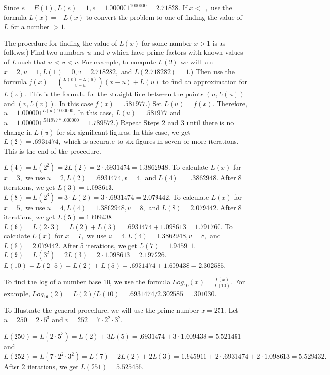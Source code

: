 Since $e = E(1), L(e) = 1, e = 1.000001^{1000000} = 2.71828.$\nl
If $x < 1,$ use the formula $L(x) = - L(x)$ to convert the problem to one of finding the value of $L$ for a number $> 1.$\nl

The procedure for finding the value of $L(x)$ for some number $x > 1$ is as follows:)  Find two numbers $u$ and $v$ which have prime factors with known values of $L$ such that $u < x < v.$  For example, to compute $L(2)$ we will use $x = 2, u = 1, L(1) = 0, v = 2.718282,$ and $L(2.718282) = 1.$)  Then use the formula $f(x) = \left(\frac{L(v)- L(u)}{v - u}\right)(x - u) + L(u)$ to find an approximation for $L(x).$  This is the formula for the straight line between the points $(u, L(u))$ and $(v, L(v)).$  In this case $f(x) = .581977.$)  Set $L(u) = f(x).$  Therefore, $u = 1.000001^{L(u)1000000}.$  In this case,  $L(u) = .581977$ and $u = 1.000001^{.581977*1000000} = 1.789572.$)  Repeat Steps 2 and 3 until there is no change in $L(u)$ for six significant figures.  In this case, we get $L(2) = .6931474,$ which is accurate to six figures in seven or more iterations.  This is the end of the    procedure.\nl

$L(4) = L(2^{2}) = 2L(2) = 2\cdot.6931474 = 1.3862948.$\nl
To calculate $L(x)$ for $x = 3,$ we use $u = 2, L(2) =.6931474, v = 4,$ and $L(4) = 1.3862948.$  After 8 iterations, we get $L(3) = 1.098613.$\nl
$L(8) = L(2^{3}) = 3\cdot L(2) = 3\cdot.6931474 = 2.079442.$\nl
To calculate $L(x)$ for $x = 5,$ we use $u = 4, L(4) = 1.3862948, v = 8,$ and $L(8) = 2.079442.$  After 8 iterations, we get $L(5) = 1.609438.$\nl
$L(6) = L(2\cdot3) = L(2) + L(3) = .6931474 + 1.098613 = 1.791760.$\nl
To calculate $L(x)$ for $x = 7,$ we use $u = 4, L(4) = 1.3862948, v = 8,$ and $ L(8) = 2.079442.$  After 5 iterations, we get $L(7) = 1.945911.$\nl
$L(9) = L(3^{2}) = 2L(3) = 2\cdot1.098613 = 2.197226.$\nl
$L(10) = L(2\cdot5) = L(2) + L(5) = .6931474 + 1.609438 = 2.302585.$\nl

To find the log of a number base 10, we use the formula $Log_{10}(x) = \frac{L(x)}{L(10)}.$   For example,
$Log_{10}(2) = L(2)/L(10) = .6931474/2.302585 = .301030.$\nl

To illustrate the general procedure, we will use the prime number $x = 251.$  Let $u = 250 = 2\cdot5^{3}$ and $v = 252 = 7\cdot2^{2}\cdot3^{2}.$\nl

$L(250) = L(2\cdot5^{3}) = L(2) + 3L(5) = .6931474 + 3\cdot1.609438 = 5.521461$ and\nl
$L(252) = L(7\cdot2^{2}\cdot3^{2}) = L(7) + 2L(2) + 2L(3) = 1.945911 + 2\cdot.6931474 + 2\cdot1.098613 = 5.529432.$  \nl
After 2 iterations, we get $L(251) = 5.525455.$\nl


